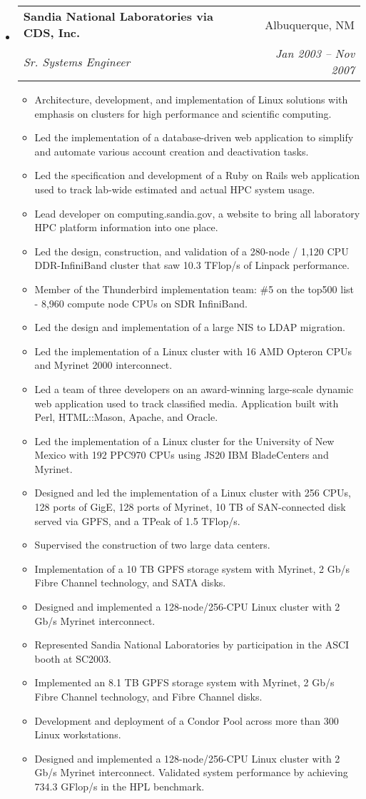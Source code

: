 \documentclass[letterpaper,10pt]{article}
\makeatletter
\newcommand{\resitem}[1]{\item #1 \vspace{-2pt}}
\newcommand{\ressubheading}[4]{
\begin{tabular*}{6.5in}{l@{\extracolsep{\fill}}r}
		\textbf{#1} & #2 \\
		\textit{#3} & \textit{#4} \\
\end{tabular*}\vspace{-6pt}}
\makeatother
\begin{document}
\begin{itemize}
\item
    \ressubheading{Sandia National Laboratories via CDS, Inc.}{Albuquerque, NM}{Sr. Systems Engineer}{Jan 2003 -- Nov 2007}
    \begin{itemize}
        \resitem{Architecture, development, and implementation of Linux solutions with emphasis on clusters for high performance and scientific computing.}
        \resitem{Led the implementation of a database-driven web application to simplify and automate various account creation and deactivation tasks.}
        \resitem{Led the specification and development of a Ruby on Rails web application used to track lab-wide estimated and actual HPC system usage.}
        \resitem{Lead developer on computing.sandia.gov, a website to bring all laboratory HPC platform information into one place.}
        \resitem{Led the design, construction, and validation of a 280-node / 1,120 CPU DDR-InfiniBand cluster that saw 10.3 TFlop/s of Linpack performance.}
        \resitem{Member of the Thunderbird implementation team: \#5 on the top500 list - 8,960 compute node CPUs on SDR InfiniBand.}
        \resitem{Led the design and implementation of a large NIS to LDAP migration.}
        \resitem{Led the implementation of a Linux cluster with 16 AMD Opteron CPUs and Myrinet 2000 interconnect.}
        \resitem{Led a team of three developers on an award-winning large-scale dynamic web application used to track classified media. Application built with Perl, HTML::Mason, Apache, and Oracle.}
        \resitem{Led the implementation of a Linux cluster for the University of New Mexico with 192 PPC970 CPUs using JS20 IBM BladeCenters and Myrinet.}
        \resitem{Designed and led the implementation of a Linux cluster with 256 CPUs, 128 ports of GigE, 128 ports of Myrinet, 10 TB of SAN-connected disk served via GPFS, and a TPeak of 1.5 TFlop/s.}
        \resitem{Supervised the construction of two large data centers.}
        \resitem{Implementation of a 10 TB GPFS storage system with Myrinet, 2 Gb/s Fibre Channel technology, and SATA disks.}
        \resitem{Designed and implemented a 128-node/256-CPU Linux cluster with 2 Gb/s Myrinet interconnect.}
        \resitem{Represented Sandia National Laboratories by participation in the ASCI booth at SC2003.}
        \resitem{Implemented an 8.1 TB GPFS storage system with Myrinet, 2 Gb/s Fibre Channel technology, and Fibre Channel disks.}
        \resitem{Development and deployment of a Condor Pool across more than 300 Linux workstations.}
        \resitem{Designed and implemented a 128-node/256-CPU Linux cluster with 2 Gb/s Myrinet interconnect.  Validated system performance by achieving 734.3 GFlop/s in the HPL benchmark.}

\end{itemize}
\end{itemize}
\end{document}

